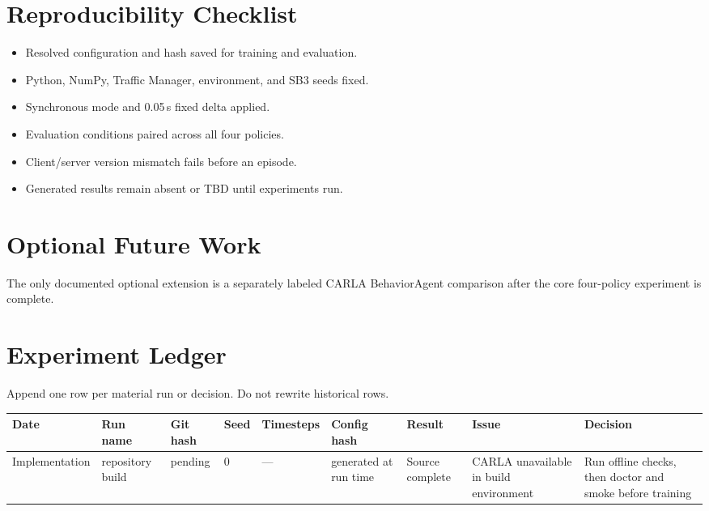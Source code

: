 \documentclass[10pt]{article}
\begin{document}
\section{Reproducibility Checklist}
\begin{itemize}
  \item Resolved configuration and hash saved for training and evaluation.
  \item Python, NumPy, Traffic Manager, environment, and SB3 seeds fixed.
  \item Synchronous mode and 0.05\,s fixed delta applied.
  \item Evaluation conditions paired across all four policies.
  \item Client/server version mismatch fails before an episode.
  \item Generated results remain absent or TBD until experiments run.
\end{itemize}

\section{Optional Future Work}
The only documented optional extension is a separately labeled CARLA
BehaviorAgent comparison after the core four-policy experiment is complete.

\section{Experiment Ledger}
Append one row per material run or decision. Do not rewrite historical rows.

\begin{longtable}{p{1.2cm}p{1.6cm}p{1.2cm}p{0.7cm}p{1.1cm}p{1.4cm}p{1.3cm}p{1.6cm}p{1.5cm}}
\toprule
Date & Run name & Git hash & Seed & Timesteps & Config hash & Result & Issue & Decision \\
\midrule
\endhead
Implementation & repository build & pending & 0 & --- & generated at run time &
Source complete & CARLA unavailable in build environment &
Run offline checks, then doctor and smoke before training \\
\bottomrule
\end{longtable}
\end{document}
